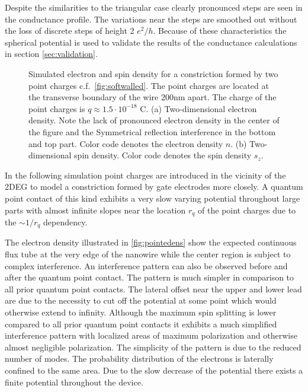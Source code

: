 Despite the similarities to the triangular case clearly pronounced steps are seen in the conductance profile. The variations near the steps are smoothed out without the loss of discrete steps of height 2 $e^2/h$. Because of these characteristics the spherical potential is used to validate the results of the conductance calculations in section \ref{sec:validation}.\par
\begin{figure}[h]
\caption{Simulated electron and spin density for a constriction formed by two point charges c.f.~\cref{fig:softwalled}. The point charges are located at the transverse boundary of the wire 200nm apart. The charge of the point charges is $q\approx 1.5\cdot 10^{-18}$ C. (a) Two-dimensional electron density. Note the lack of pronounced electron density in the center of the figure and the Symmetrical reflection interference in the bottom and top part. Color code denotes the electron density $n$. (b) Two-dimensional spin density. Color code denotes the spin density $s_z$.}
\end{figure}
In the following simulation point charges are introduced in the vicinity of the 2DEG to model a constriction formed by gate electrodes more closely. A quantum point contact of this kind exhibits a very slow varying potential throughout large parts with almost infinite slopes near the location $r_q$ of the point charges due to the $\sim 1/r_q$ dependency.\par
The electron density illustrated in \cref{fig:pointedens} show the expected continuous flux tube at the very edge of the nanowire while the center region is subject to complex interference. An interference pattern can also be observed before and after the quantum point contact. The pattern is much simpler in comparison to all prior quantum point contacts. The lateral offset near the upper and lower lead are due to the necessity to cut off the potential at some point which would otherwise extend to infinity.
Although the maximum spin splitting is lower compared to all prior quantum point contacts it exhibits a much simplified interference pattern with localized areas of maximum polarization and otherwise almost negligible polarization. The simplicity of the pattern is due to the reduced number of modes. The probability distribution of the electrons is laterally confined to the same area. Due to the slow decrease of the potential there exists a finite potential throughout the device.\par
